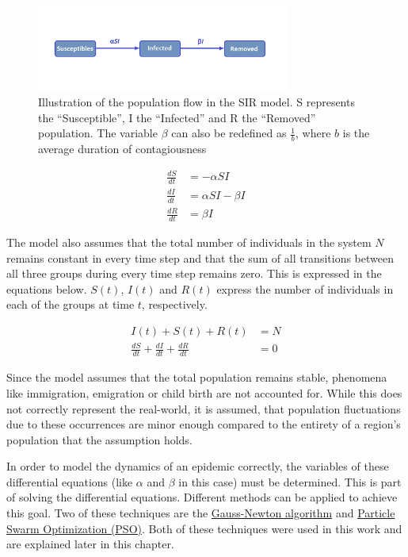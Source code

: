 \begin{figure}
	\begin{center}
		\includegraphics[width=0.75\textwidth]{./figures/SIR.png}
		\caption[Scheme of the SIR model]{Illustration of the population flow in the SIR model. S represents the ``Susceptible'', I
			the ``Infected'' and R the ``Removed'' population. The variable $\beta$ can also be redefined
			as $\frac{1}{b}$, where $b$ is the average duration of contagiousness}
		\label{fig:SIR}
	\end{center}
\end{figure}


\begin{align}
	\label{eq:SIR1}
	\frac{dS}{dt} &= -\alpha S I \\
	\frac{dI}{dt} &= \alpha S I - \beta I \\
	\frac{dR}{dt} &= \beta I
\end{align}


The model also assumes that the total number of individuals in the system $N$ remains constant in every time step and
that the sum of all transitions between all three groups during every time step remains zero\cite{kermack1991contributions}. This is expressed in the equations below.
$S(t)$, $I(t)$ and $R(t)$ express the number of individuals in each of the groups at time $t$, respectively.

\begin{align}
	\label{eq:SIR2}
	I(t) + S(t) + R(t) &= N \\
	\frac{dS}{dt} + \frac{dI}{dt} + \frac{dR}{dt} &= 0
\end{align}


Since the model assumes that the total population remains stable, phenomena like immigration, emigration or child birth are not accounted
for. While this does not correctly represent the real-world, it is assumed, that population fluctuations
due to these occurrences are minor enough compared to the entirety of a region's population that the assumption holds.\newline


In order to model the dynamics of an epidemic correctly, the variables of these differential
equations (like $\alpha$ and $\beta$ in this case) must be determined. This is part of solving the differential equations.
Different methods can be applied to achieve this goal. Two of these techniques are the \hyperref[sec:Gauss]{Gauss-Newton algorithm}
and \hyperref[sec:PSO]{Particle Swarm Optimization (PSO)}. Both of these techniques were used in this work and are explained
later in this chapter.


